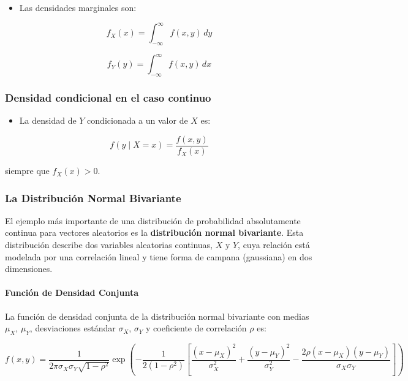 \documentclass[
]{article}
\providecommand{\tightlist}{%
  \setlength{\itemsep}{0pt}\setlength{\parskip}{0pt}}
\begin{document}
\begin{itemize}
\tightlist
\item
  Las densidades marginales son:
\end{itemize}

\[
f_X(x) = \int_{-\infty}^{\infty} f(x, y) \, dy
\]

\[
f_Y(y) = \int_{-\infty}^{\infty} f(x, y) \, dx
\]

\subsubsection{Densidad condicional en el caso continuo}\label{densidad-condicional-en-el-caso-continuo}

\begin{itemize}
\tightlist
\item
  La densidad de \(Y\) condicionada a un valor de \(X\) es:
\end{itemize}

\[
f(y \mid X = x) = \frac{f(x, y)}{f_X(x)}
\]

siempre que \(f_X(x) > 0\).

\subsubsection{La Distribución Normal Bivariante}\label{la-distribuciuxf3n-normal-bivariante}

El ejemplo más importante de una distribución de probabilidad absolutamente continua para vectores aleatorios es la \textbf{distribución normal bivariante}. Esta distribución describe dos variables aleatorias continuas, \(X\) y \(Y\), cuya relación está modelada por una correlación lineal y tiene forma de campana (gaussiana) en dos dimensiones.

\paragraph{Función de Densidad Conjunta}\label{funciuxf3n-de-densidad-conjunta}

La función de densidad conjunta de la distribución normal bivariante con medias \(\mu_X\), \(\mu_Y\), desviaciones estándar \(\sigma_X\), \(\sigma_Y\) y coeficiente de correlación \(\rho\) es:

\[
f(x, y) = \frac{1}{2 \pi \sigma_X \sigma_Y \sqrt{1 - \rho^2}} \exp \left( -\frac{1}{2(1 - \rho^2)} \left[ \frac{(x - \mu_X)^2}{\sigma_X^2} + \frac{(y - \mu_Y)^2}{\sigma_Y^2} - \frac{2\rho(x - \mu_X)(y - \mu_Y)}{\sigma_X \sigma_Y} \right] \right)
\]
\end{document}
